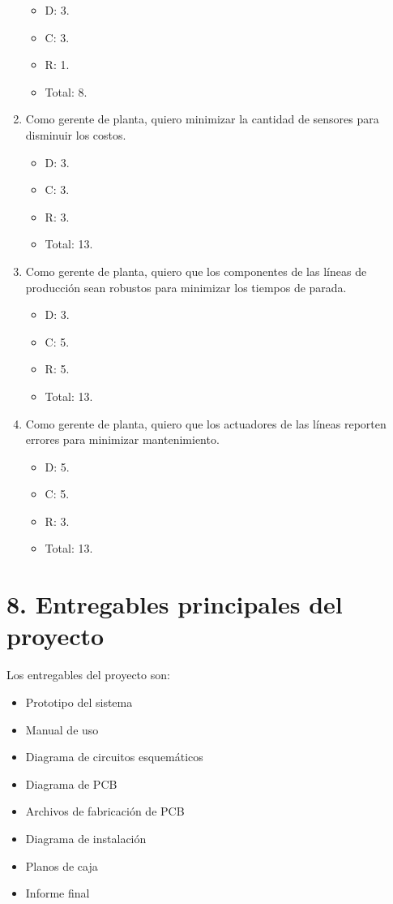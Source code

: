 \documentclass[
11pt, %
]{charter}
\begin{document}
\begin{enumerate}
\begin{itemize}
		\item D: 3.
		\item C: 3.
		\item R: 1.
		\item Total: 8.
	\end{itemize}
	\item Como gerente de planta, quiero minimizar la cantidad de sensores para disminuir los costos.
	\begin{itemize}
		\item D: 3.
		\item C: 3.
		\item R: 3.
		\item Total: 13.
	\end{itemize}
	\item Como gerente de planta, quiero que los componentes de las líneas de producción sean robustos para minimizar los tiempos de parada.
	\begin{itemize}
		\item D: 3.
		\item C: 5.
		\item R: 5.
		\item Total: 13.
	\end{itemize}
	\item Como gerente de planta, quiero que los actuadores de las líneas reporten errores para minimizar mantenimiento.
	\begin{itemize}
		\item D: 5.
		\item C: 5.
		\item R: 3.
		\item Total: 13.
	\end{itemize}
\end{enumerate}

\section{8. Entregables principales del proyecto}
\label{sec:entregables}

Los entregables del proyecto son:

\begin{itemize}
	\item Prototipo del sistema
	\item Manual de uso
	\item Diagrama de circuitos esquemáticos
	\item Diagrama de PCB
	\item Archivos de fabricación de PCB
	\item Diagrama de instalación
	\item Planos de caja
	\item Informe final
\end{itemize}
\end{document}
